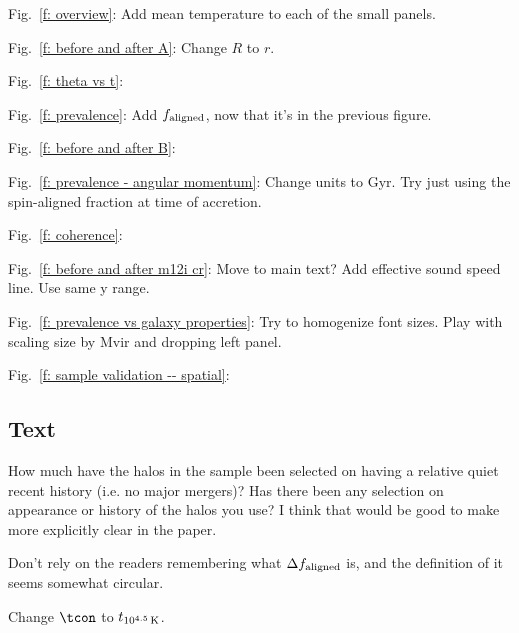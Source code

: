 Fig.~\ref{f: overview}:
Add mean temperature to each of the small panels.

Fig.~\ref{f: before and after A}:
Change $R$ to $r$.

Fig.~\ref{f: theta vs t}:

Fig.~\ref{f: prevalence}:
Add $f_{\rm aligned}$, now that it's in the previous figure.

Fig.~\ref{f: before and after B}:

Fig.~\ref{f: prevalence - angular momentum}:
Change units to Gyr.
Try just using the spin-aligned fraction at time of accretion.

Fig.~\ref{f: coherence}:

Fig.~\ref{f: before and after m12i cr}:
Move to main text?
Add effective sound speed line.
Use same y range.

Fig.~\ref{f: prevalence vs galaxy properties}:
Try to homogenize font sizes.
Play with scaling size by Mvir and dropping left panel.

Fig.~\ref{f: sample validation -- spatial}:

\subsection{Text}

How much have the halos in the sample been selected on having a relative quiet recent history (i.e. no major mergers)? Has there been any selection on appearance or history of the halos you use? I think that would be good to make more explicitly clear in the paper. 

Don't rely on the readers remembering what $\Delta f_{\rm aligned}$ is, and the definition of it seems somewhat circular.

Change $\tcon$ to $t_{10^{4.5}\,{\rm K}}$.

